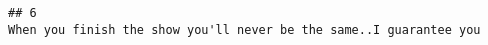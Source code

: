 \documentclass[
]{article}
\begin{document}
\begin{verbatim}
## 6                                                                                                                                                                                                                                                                                                                                                                                                                                                                                                                                                                                                                                                                                                                                                                                                                                                                                                                                                                                                                                                                                                                                                                                                                                                                                                                                                                                                                                                                                                                                                                                                                                                                                                                                                                                                                                                                                                                                                                                                                                                                                                                                                When you finish the show you'll never be the same..I guarantee you

\end{verbatim}
\end{document}
